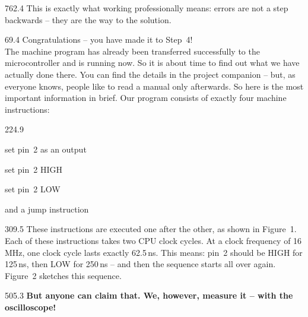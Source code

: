 \documentclass{aslab}
\begin{document}
\begin{region}{762.4}
This is exactly what working professionally means: errors are not a step
backwards -- they are the way to the solution.
\end{region}

\nextpage

\begin{region}[width=294]{69.4}
\blank
Congratulations -- you have made it to Step~4!\\
The machine program has already been transferred successfully to the
microcontroller and is running now. So it is about time to find out what we
have actually done there.
\blank
You can find the details in the project companion -- but, as everyone
knows, people like to read a manual only afterwards. So here is the most
important information in brief. Our program consists of exactly four
machine instructions:
\end{region}

\begin{region}{224.9}
\begin{dashlist}
\item set pin~2 as an output
\item set pin~2 HIGH
\item set pin~2 LOW
\item and a jump instruction
\end{dashlist}
\end{region}


\begin{region}{309.5}
These instructions are executed one after the other, as shown in
Figure~1. Each of these instructions takes two CPU clock cycles. At a clock
frequency of 16\,MHz, one clock cycle lasts exactly 62.5\,ns. This means:
pin~2 should be HIGH for 125\,ns, then LOW for 250\,ns -- and then the
sequence starts all over again. Figure~2 sketches this sequence.
\end{region}



\begin{region}{505.3}
\textbf{But anyone can claim that. We, however, measure it -- with the
oscilloscope!}
\end{region}
\end{document}
